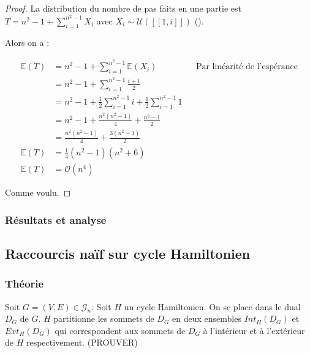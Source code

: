 \documentclass[french,a4paper]{article}
\newtheorem{proof}{Preuve}[section]
\begin{document}

\begin{proof}
La distribution du nombre de pas faits en une partie est $T=n^{2}-1+\sum\limits_{i=1}^{n^{2}-1}X_{i}$ avec $X_{i} \sim \mathcal{U}([\![1,i]\!])$ (\cite{Du2022AlphaSnakePI}).

Alors on a :

\begin{align*}
\mathbb{E}(T) & =n^2-1+\sum\limits_{i=1}^{n^{2}-1}\mathbb{E}(X_{i}) && \text{Par linéarité de l'espérance}\\
& =n^2-1+\sum\limits_{i=1}^{n^{2}-1} \frac{i+1}{2} \\
& =n^2-1+\frac{1}{2}\sum\limits_{i=1}^{n^{2}-1} i + \frac{1}{2}\sum\limits_{i=1}^{n^{2}-1} 1 \\
& =n^2-1+\frac{n^2(n^2-1)}{4} + \frac{n^2-1}{2} \\
& =\frac{n^2(n^2-1)}{4} + \frac{3(n^2-1)}{2} \\
\mathbb{E}(T) & =\frac{1}{4}(n^2-1)(n^2+6) \\
\mathbb{E}(T) & =\mathcal{O}(n^4)
\end{align*}

Comme voulu.

\end{proof}


\subsubsection{Résultats et analyse}


\subsection{Raccourcis naïf sur cycle Hamiltonien}

\subsubsection{Théorie}


Soit $G=(V,E) \in \mathcal{G}_n$. Soit $H$ un cycle Hamiltonien. On se place dans le dual $D_G$ de $G$. $H$ partitionne les sommets de $D_G$ en deux ensembles $Int_{H}(D_G)$ et $Ext_{H}(D_G)$ qui correspondent aux sommets de $D_G$ à l'intérieur et à l'extérieur de $H$ respectivement. (PROUVER)
\end{document}
